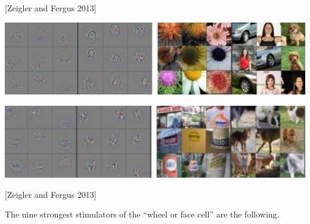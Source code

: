 {\centerline{[Zeigler and Fergus 2013]}



\centerline{\includegraphics[width = 8in]{../images/Deconv5a}}

\centerline{\includegraphics[width = 8in]{../images/Deconv5b}}

\centerline{[Zeigler and Fergus 2013]}


The nine strongest stimulators of the ``wheel or face cell'' are the following.

}
